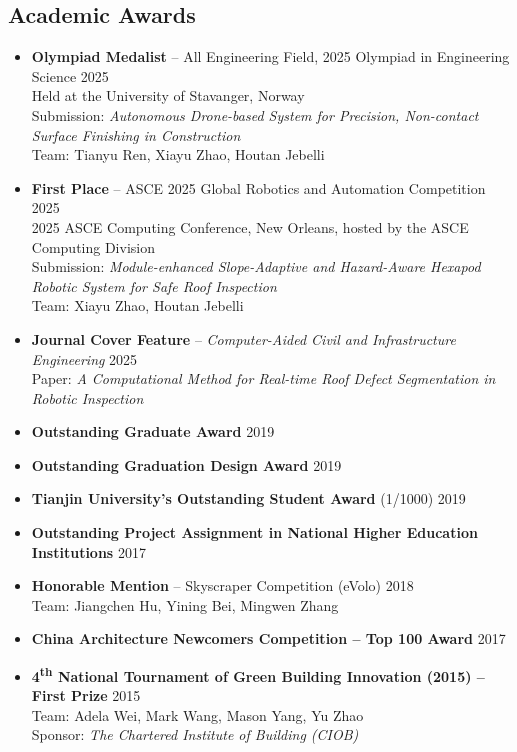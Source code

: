 \documentclass[11pt,a4paper]{article}
\newcommand{\entrytitle}[1]{\textbf{#1}}
\newcommand{\entrydetail}[1]{\textit{#1}}
\begin{document}
\subsection*{Academic Awards}
\begin{itemize}[nosep, leftmargin=1.5em]
    \item \entrytitle{Olympiad Medalist} -- All Engineering Field, 2025 Olympiad in Engineering Science \hfill 2025 \\
    Held at the University of Stavanger, Norway \\
    Submission: \entrydetail{Autonomous Drone-based System for Precision, Non-contact Surface Finishing in Construction} \\
    Team: Tianyu Ren, Xiayu Zhao, Houtan Jebelli
    \item \entrytitle{First Place} -- ASCE 2025 Global Robotics and Automation Competition \hfill 2025 \\
    2025 ASCE Computing Conference, New Orleans, hosted by the ASCE Computing Division \\
    Submission: \entrydetail{Module-enhanced Slope-Adaptive and Hazard-Aware Hexapod Robotic System for Safe Roof Inspection} \\
    Team: Xiayu Zhao, Houtan Jebelli
    \item \entrytitle{Journal Cover Feature} -- \entrydetail{Computer-Aided Civil and Infrastructure Engineering} \hfill 2025 \\
    Paper: \entrydetail{A Computational Method for Real-time Roof Defect Segmentation in Robotic Inspection}
    \item \entrytitle{Outstanding Graduate Award} \hfill 2019
    \item \entrytitle{Outstanding Graduation Design Award} \hfill 2019
    \item \entrytitle{Tianjin University's Outstanding Student Award} (1/1000) \hfill 2019
    \item \entrytitle{Outstanding Project Assignment in National Higher Education Institutions} \hfill 2017
    \item \entrytitle{Honorable Mention} -- Skyscraper Competition (eVolo) \hfill 2018 \\
    Team: Jiangchen Hu, Yining Bei, Mingwen Zhang
    \item \entrytitle{China Architecture Newcomers Competition -- Top 100 Award} \hfill 2017
    \item \entrytitle{4\textsuperscript{th} National Tournament of Green Building Innovation (2015) -- First Prize} \hfill 2015 \\
    Team: Adela Wei, Mark Wang, Mason Yang, Yu Zhao \\
    Sponsor: \entrydetail{The Chartered Institute of Building (CIOB)}
\end{itemize}
\end{document}
